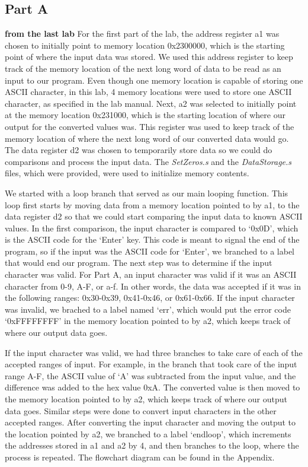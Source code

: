 \documentclass[letterpaper]{article}
\begin{document}
  \subsection{Part A}
  \textbf{from the last lab}
    For the first part of the lab, the address register a1 was chosen to initially point to
    memory location 0x2300000, which is the starting point of where the input data was stored.
    We used this address register to keep track of the memory location of the next long word
    of data to be read as an input to our program. Even though one memory location is capable
    of storing one ASCII character, in this lab, 4 memory locations were used to store one
    ASCII character, as specified in the lab manual.
    Next, a2 was selected to initially point at the memory location 0x231000, which is the
    starting location of where our output for the converted values was. This register
    was used to keep track of the memory location of where the next long word of
    our converted data would go. The data register d2 was chosen to temporarily store
    data so we could do comparisons and process the input data.
    The \textit{SetZeros.s} and the \textit{DataStorage.s}
    files, which were provided, were used to initialize memory contents.

    We started with a loop branch that served as our main looping function. This
    loop first starts by moving data from a memory location pointed to by a1, to
    the data register d2 so that we could start comparing the input data to known ASCII values.
    In the first comparison, the input character is compared to `0x0D', which is the ASCII
    code for the `Enter' key. This code is meant to signal the end of the program, so if
    the input was the ASCII code for `Enter', we branched to a label that
    would end our program. The next step was to determine if the input character was valid.
    For Part A, an input character was valid if it was an ASCII character from 0-9, A-F, or a-f.
    In other words, the data was accepted if it was in the following ranges: 0x30-0x39,
    0x41-0x46, or 0x61-0x66. If the input character was invalid, we brached to a label
    named `err', which would put the error code `0xFFFFFFFF' in the memory location
    pointed to by a2, which keeps track of where our output data goes.

    If the input character was valid, we had three branches to take care of each
    of the accepted ranges of input. For example, in the branch that took care of the
    input range A-F, the ASCII value of `A' was subtracted from the input value, and
    the difference was added to the hex value 0xA. The converted value is then moved
    to the memory location pointed to by a2, which keeps track of where our output data goes.
    Similar steps were done to convert input characters in the other accepted ranges.
    After converting the input character and moving the output to the location pointed by a2,
    we branched to a label `endloop', which increments the addresses stored in a1 and a2 by 4,
    and then branches to the loop, where the process is repeated. The flowchart diagram can
    be found in the Appendix.
\end{document}
